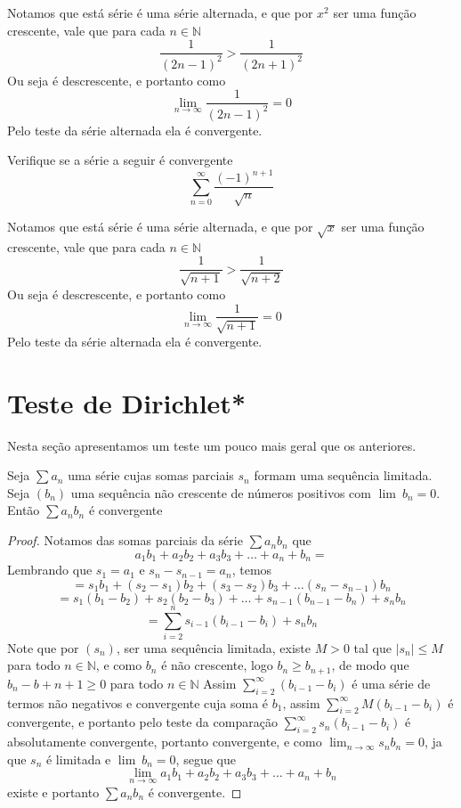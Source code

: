 \begin{resp}
    Notamos que está série é uma série alternada, e que por $x^2$ ser uma
    função crescente, vale que para cada $n \in \mathbb{N}$
    $$\frac{1}{(2n-1)^2} > \frac{1}{(2n+1)^2}$$
    Ou seja é descrescente, e portanto como
    $$\lim_{n \to \infty}\frac{1}{(2n-1)^2} = 0 $$
    Pelo teste da série alternada ela é convergente.
\end{resp}

\begin{exer}
    Verifique se a série a seguir é convergente
    $$\sum_{n = 0}^{\infty} \frac{(-1)^{n+1}}{\sqrt n} $$
\end{exer}

\begin{resp}
    Notamos que está série é uma série alternada, e que por $\sqrt x$ ser uma
    função crescente, vale que para cada $n \in \mathbb{N}$
    $$\frac{1}{\sqrt{n+1}} > \frac{1}{\sqrt{n+2}}$$
    Ou seja é descrescente, e portanto como
    $$\lim_{n \to \infty} \frac{1}{\sqrt{n+1}} = 0 $$
    Pelo teste da série alternada ela é convergente.
\end{resp}


\section{Teste de Dirichlet*}
\construirSec

Nesta seção apresentamos um teste um pouco mais geral que os anteriores.

\begin{teo}
    Seja $\sum a_n$ uma série cujas somas parciais $s_n$ formam uma
    sequência limitada. Seja $(b_n)$ uma sequência não crescente de números
    positivos com $\lim{\:} b_n = 0$. Então $\sum a_n b_n$ é convergente
\end{teo}

\begin{proof}
    Notamos das somas parciais da série $\sum a_n b_n$ que
    $$ a_1b_1 +a_2b_2 + a_3b_3 + \dots + a_n +b_n=$$
    Lembrando que $s_1 = a_1$ e $s_n -s_{n-1}= a_n$, temos
    $$ = s_1b_1 + (s_2 - s_1)b_2 + (s_3 - s_2)b_3 + \dots (s_n-s_{n-1})b_n$$
    $$ =s_1(b_1 - b_2) + s_2(b_2 - b_3) + \dots +s_{n-1}(b_{n-1}-b_n) + s_nb_n$$
    $$ = \sum_{i=2}^n s_{i-1}(b_{i-1}-b_i) + s_nb_n$$
    Note que por $(s_n)$, ser uma sequência limitada, existe $M>0$ tal que
    $|s_n| \leq M$ para todo $n \in \mathbb{N}$, e como $b_n$ é não crescente, logo
    $b_n \geq b_{n+1}$, de modo que $ b_n -b+{n+1} \geq 0$ para todo $n \in \mathbb{N}$
    Assim $\sum_{i=2}^{\infty} (b_{i-1}-b_i)$ é uma série de termos não negativos
    e convergente cuja soma é $b_1$, assim $\sum_{i=2}^{\infty} M(b_{i-1}-b_i)$
    é convergente, e portanto pelo teste da comparação $\sum_{i=2}^{\infty} 
    s_n(b_{i-1}-b_i)$ é absolutamente convergente, portanto convergente, e como
    $\lim_{n \to \infty} s_n b_n = 0$, ja que $s_n$ é limitada e $\lim{\:}b_n = 0$,
    segue que
    $$ \lim_{n \to \infty} a_1b_1 +a_2b_2 + a_3b_3 + \dots + a_n +b_n$$
    existe e portanto $\sum a_n b_n$ é convergente.
\end{proof}
